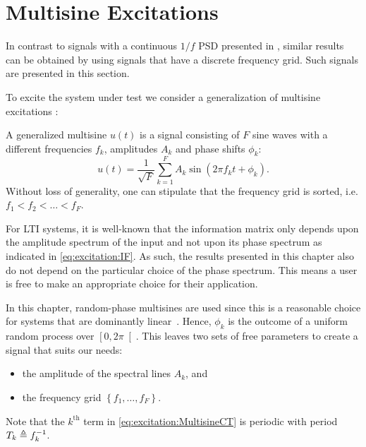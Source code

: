 \section{Multisine Excitations}
\label{sec:excitation:multisine}
In contrast to signals with a continuous $1/f$ \gls{PSD} presented in , similar results can be obtained by using signals that have a discrete frequency grid.
Such signals are presented in this section.

  To excite the system under test we consider a generalization of multisine excitations \citep{Pintelon2012}:
  \begin{definition} \label{def:excitation:generalized-MS}
  A generalized multisine $u(t)$ is a signal consisting of $F$ sine waves with a different frequencies $f_k$, amplitudes $A_k$ and phase shifts $\phi_k$:
  \begin{equation}
    u \left( t\right) = \frac{1}{\sqrt{F}}
   \sum_{k=1}^{F} 
     A_k 
     \sin 
       \left(2\pi f_k t + \phi_k \right)
  \text{.}
  \label{eq:excitation:MultisineCT}
  \end{equation}
  Without loss of generality, one can stipulate that the frequency grid is sorted, i.e. $f_1 < f_2 < \ldots < f_F$.
  \end{definition}

  For \gls{LTI} systems, it is well-known that the information matrix only depends upon the amplitude spectrum of the input and not upon its phase spectrum as indicated in \eqref{eq:excitation:IF}.
  As such, the results presented in this chapter also do not depend on the particular choice of the phase spectrum.
  This means a user is free to make an appropriate choice for their application.
  
  In this chapter, random-phase multisines are used since this is a reasonable choice for systems that are dominantly linear~\citep{Schoukens2004}.
  Hence, $\phi_k$ is the outcome of a uniform random process over $\left[0,2\pi\right[$.
  This leaves two sets of free parameters to create a signal that suits our needs:
  \begin{itemize}
    \item the amplitude of the spectral lines $A_k$, and
    \item the frequency grid $\left\{f_1, \ldots, f_F \right\}$.
  \end{itemize}
  Note that the $k^{\text{th}}$ term in \eqref{eq:excitation:MultisineCT} is periodic with period $T_k \triangleq f_k^{-1}$.

